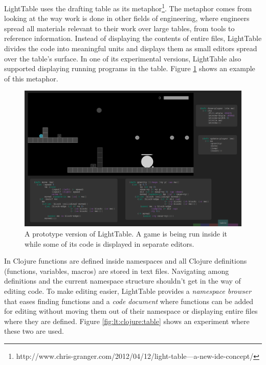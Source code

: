 \documentclass{./llncs2e/llncs}
\begin{document}
	LightTable uses the drafting table as its metaphor\footnote{http://www.chris-granger.com/2012/04/12/light-table---a-new-ide-concept/}. The metaphor comes from looking at the way work is done in other fields of engineering, where engineers spread all materials relevant to their work over large tables, from tools to reference information. 
	Instead of displaying the contents of entire files, LightTable divides the code into meaningful units and displays them as small editors spread over the table's surface. In one of its experimental versions, LightTable also supported displaying running programs in the table. Figure \ref{fig:lt:draft:table} shows an example of this metaphor.


	\begin{figure}
	  \centering
	  \includegraphics[width=1.0\textwidth]{img/lt_game_example}
	    \caption{A prototype version of LightTable. A game is being run inside it while some of its code is displayed in separate editors.}
	  \label{fig:lt:draft:table}
	\end{figure} 

	In Clojure functions are defined inside namespaces and all Clojure definitions (functions, variables, macros) are stored in text files. Navigating among definitions and the current namespace structure shouldn't get in the way of editing code. To make editing easier, LightTable provides a \emph{namespace browser} that eases finding functions and a \emph{code document} where functions can be added for editing without moving them out of their namespace or displaying entire files where they are defined. Figure \ref{fig:lt:clojure:table} shows an experiment where these two are used.
\end{document}
